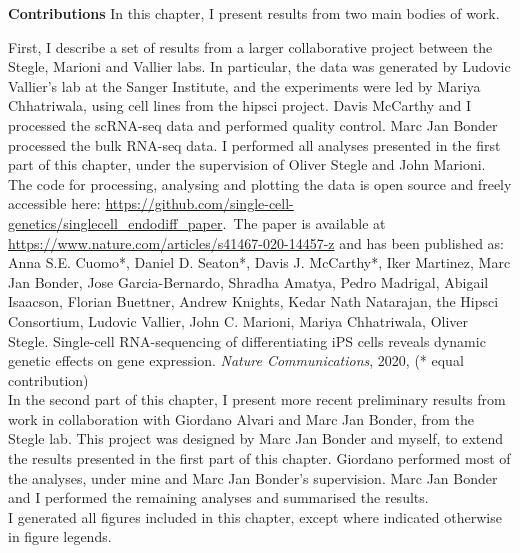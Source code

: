 \begin{Comment2}
\hspace{-3mm}\textbf{Contributions} 
In this chapter, I present results from two main bodies of work.

First, I describe a set of results from a larger collaborative project between the Stegle, Marioni and Vallier labs. 
In particular, the data was generated by Ludovic Vallier’s lab at the Sanger Institute, and the experiments were led by Mariya Chhatriwala, using cell lines from the \gls{hipsci} project.
Davis McCarthy and I processed the scRNA-seq data and performed quality control.
Marc Jan Bonder processed the bulk RNA-seq data.
I performed all analyses presented in the first part of this chapter, under the supervision of Oliver Stegle and John Marioni.
The code for processing, analysing and plotting the data is open source and freely accessible here: \url{https://github.com/single-cell-genetics/singlecell\_endodiff\_paper}.\
The paper 
is available at \url{https://www.nature.com/articles/s41467-020-14457-z} and has been published as:\\

Anna S.E. Cuomo*, Daniel D. Seaton*, Davis J. McCarthy*, Iker Martinez, Marc Jan Bonder, Jose Garcia-Bernardo, Shradha Amatya, Pedro Madrigal, Abigail Isaacson, Florian Buettner, Andrew Knights, Kedar Nath Natarajan, the Hipsci Consortium, Ludovic Vallier, John C. Marioni, Mariya Chhatriwala, Oliver Stegle. Single-cell RNA-sequencing of differentiating iPS cells reveals dynamic genetic effects on gene expression. \textit{Nature Communications}, 2020, (* equal contribution)\\


In the second part of this chapter, I present more recent preliminary results from work in collaboration with Giordano Alvari and Marc Jan Bonder, from the Stegle lab.
This project was designed by Marc Jan Bonder and myself, to extend the results presented in the first part of this chapter.
Giordano performed most of the analyses, under mine and Marc Jan Bonder's supervision.
Marc Jan Bonder and I performed the remaining analyses and summarised the results.\\

I generated all figures included in this chapter, except where indicated otherwise in figure legends.
\end{Comment2}

